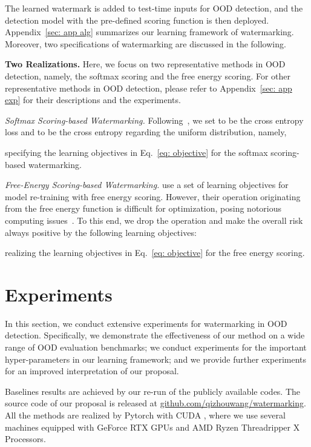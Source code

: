 \documentclass{article}
\begin{document}
The learned watermark is added to test-time inputs for OOD detection, and the detection model with the pre-defined scoring function is then deployed. Appendix~\ref{sec: app alg} summarizes our learning framework of watermarking. Moreover, two specifications of watermarking are discussed in the following.










\textbf{Two Realizations.}
Here, we focus on two representative methods in OOD detection, namely, the softmax scoring and the free energy scoring. {For other representative methods in OOD detection, please refer to Appendix~\ref{sec: app exp} for their descriptions and the experiments.}  

\textit{Softmax Scoring-based Watermarking.} Following~\cite{HendrycksMD19}, we set  to be the cross entropy loss and   to be the cross entropy regarding the uniform distribution, namely,

specifying the learning objectives in Eq.~\eqref{eq: objective} for the softmax scoring-based watermarking. 

\textit{Free-Energy Scoring-based Watermarking.} \cite{liu2020energy} use a set of learning objectives for model re-training with free energy scoring. However, their  operation originating from the free energy function is difficult for optimization, posing notorious computing issues~\cite{mann2006numerically}. To this end, we drop the  operation and make the overall risk always positive by the following learning objectives:

realizing the learning objectives in Eq.~\eqref{eq: objective} for the free energy scoring. 


\section{Experiments} \label{sec: experiment}

In this section, we conduct extensive experiments for watermarking in OOD detection. Specifically, we demonstrate the effectiveness of our method on a wide range of OOD evaluation benchmarks; we conduct experiments for the important hyper-parameters in our learning framework; and we provide further experiments for an improved interpretation of our proposal. 

Baselines results are achieved by our re-run of the publicly available codes. The source code of our proposal is released at  \href{https://github.com/QizhouWang/watermarking}{github.com/qizhouwang/watermarking}.
All the methods are realized by Pytorch  with CUDA , where we use several machines equipped with GeForce RTX  GPUs and AMD Ryzen Threadripper X Processors. 
\end{document}
